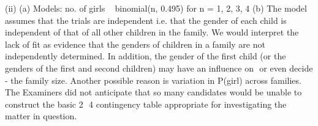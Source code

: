 (ii) (a) Models: no. of girls ~ binomial(n, 0.495) for n = 1, 2, 3, 4
(b) The model assumes that the trials are independent i.e. that the gender
of each child is independent of that of all other children in the family.
We would interpret the lack of fit as evidence that the genders of
children in a family are not independently determined.
In addition, the gender of the first child (or the genders of the first and
second children) may have an influence on  or even decide - the
family size.
Another possible reason is variation in P(girl) across families.
The Examiners did not anticipate that so many candidates would be unable to construct the
basic 2  4 contingency table appropriate for investigating the matter in question.
